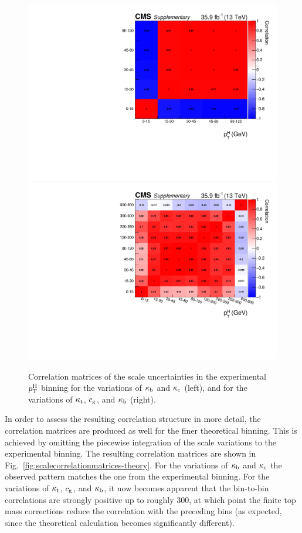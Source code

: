 \begin{figure}[hbtp]
  \begin{center}
    \includegraphics[width=\halflinewidth]{img/interpretation/other/corrmat_yukawa.pdf}
    \includegraphics[width=\halflinewidth]{img/interpretation/other/corrmat_tophighpt.pdf}
    \caption{
        Correlation matrices of the scale uncertainties in the experimental $p_\mathrm{T}^\mathrm{H}$ binning for the variations of $\kappa_{\mathrm{b}}$ and $\kappa_{\mathrm{c}}$ (left), and for the variations of $\kappa_{\mathrm{t}}$, $c_\mathrm{g}$, and $\kappa_{\mathrm{b}}$ (right).
        }
    \label{fig:scalecorrelationmatrices}
  \end{center}
\end{figure}


In order to assess the resulting correlation structure in more detail, the correlation matrices are produced as well for the finer theoretical binning.
% 
This is achieved by omitting the piecewise integration of the scale variations to the experimental binning.
% 
The resulting correlation matrices are shown in Fig.~\ref{fig:scalecorrelationmatrices-theory}.
% 
For the variations of $\kappa_{\mathrm{b}}$ and $\kappa_{\mathrm{c}}$ the observed pattern matches the one from the experimental binning.
% 
For the variations of $\kappa_{\mathrm{t}}$, $c_\mathrm{g}$, and $\kappa_{\mathrm{b}}$, it now becomes apparent that the bin-to-bin correlations are strongly positive up to roughly $300$\GeV, at which point the finite top mass corrections reduce the correlation with the preceding bins (as expected, since the theoretical calculation becomes significantly different).


